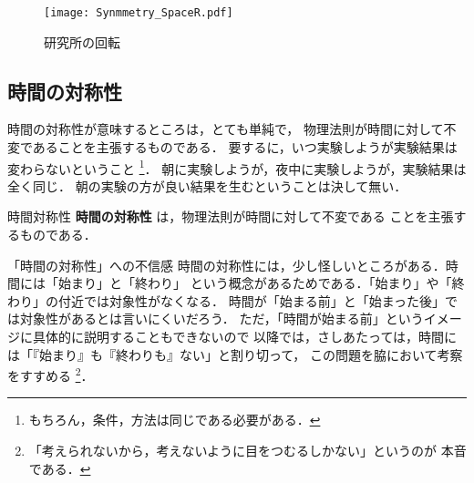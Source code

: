                     \begin{figure}[hbt]
                        \begin{center}
                            \texttt{[image: Synmmetry\_SpaceR.pdf]}
                            \caption{研究所の回転}
                            \label{fig:Synmmetry_SpaceR}
                        \end{center}
                    \end{figure}


        \subsection{時間の対称性}
            時間の対称性が意味するところは，とても単純で，
            物理法則が時間に対して不変であることを主張するものである．
            要するに，いつ実験しようが実験結果は変わらないということ
                \footnote{
                    もちろん，条件，方法は同じである必要がある．
                }．
            朝に実験しようが，夜中に実験しようが，実験結果は全く同じ．
            朝の実験の方が良い結果を生むということは決して無い．
                    \begin{myshadebox}{時間対称性}
                        \textbf{時間の対称性} は，物理法則が時間に対して不変である
                        ことを主張するものである．
                    \end{myshadebox}
            
            \begin{memo}{「時間の対称性」への不信感}
                時間の対称性には，少し怪しいところがある．時間には「始まり」と「終わり」
                という概念があるためである．「始まり」や「終わり」の付近では対象性がなくなる．
                時間が「始まる前」と「始まった後」では対象性があるとは言いにくいだろう．
                ただ，「時間が始まる前」というイメージに具体的に説明することもできないので
                以降では，さしあたっては，時間には「『始まり』も『終わりも』ない」と割り切って，
                この問題を脇において考察をすすめる
                    \footnote{
                        「考えられないから，考えないように目をつむるしかない」というのが
                        本音である．
                    }．
                
            \end{memo}


